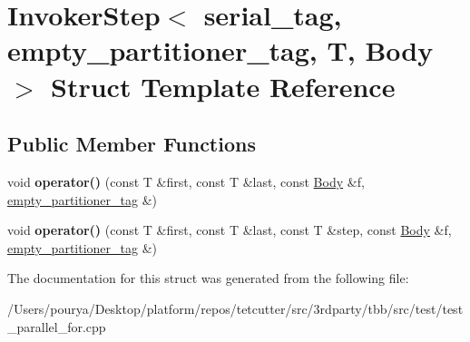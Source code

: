 \hypertarget{structInvokerStep_3_01serial__tag_00_01empty__partitioner__tag_00_01T_00_01Body_01_4}{}\section{Invoker\+Step$<$ serial\+\_\+tag, empty\+\_\+partitioner\+\_\+tag, T, Body $>$ Struct Template Reference}
\label{structInvokerStep_3_01serial__tag_00_01empty__partitioner__tag_00_01T_00_01Body_01_4}
\subsection*{Public Member Functions}
\begin{DoxyCompactItemize}
\item 
\hypertarget{structInvokerStep_3_01serial__tag_00_01empty__partitioner__tag_00_01T_00_01Body_01_4_a5559f7fbaf015b232d79408afbda9fdf}{}void {\bfseries operator()} (const T \&first, const T \&last, const \hyperlink{classBody}{Body} \&f, \hyperlink{structempty__partitioner__tag}{empty\+\_\+partitioner\+\_\+tag} \&)\label{structInvokerStep_3_01serial__tag_00_01empty__partitioner__tag_00_01T_00_01Body_01_4_a5559f7fbaf015b232d79408afbda9fdf}

\item 
\hypertarget{structInvokerStep_3_01serial__tag_00_01empty__partitioner__tag_00_01T_00_01Body_01_4_a22464f4bc8b42fe82ec1cdcb3a46e8e7}{}void {\bfseries operator()} (const T \&first, const T \&last, const T \&step, const \hyperlink{classBody}{Body} \&f, \hyperlink{structempty__partitioner__tag}{empty\+\_\+partitioner\+\_\+tag} \&)\label{structInvokerStep_3_01serial__tag_00_01empty__partitioner__tag_00_01T_00_01Body_01_4_a22464f4bc8b42fe82ec1cdcb3a46e8e7}

\end{DoxyCompactItemize}


The documentation for this struct was generated from the following file\+:\begin{DoxyCompactItemize}
\item 
/\+Users/pourya/\+Desktop/platform/repos/tetcutter/src/3rdparty/tbb/src/test/test\+\_\+parallel\+\_\+for.\+cpp\end{DoxyCompactItemize}
